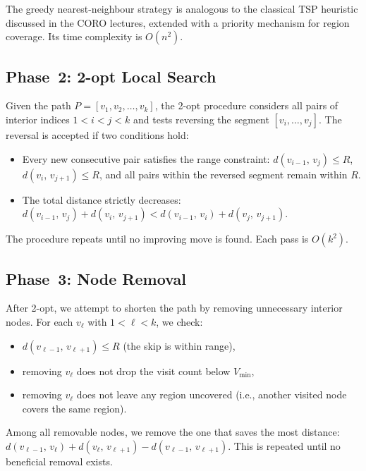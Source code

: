 \documentclass[12pt, a4paper]{article}
\newcommand{\dist}[2]{d(#1,\,#2)}
\begin{document}
The greedy nearest-neighbour strategy is analogous to the classical TSP heuristic
discussed in the CORO lectures, extended with a priority mechanism for region
coverage. Its time complexity is $O(n^2)$.

\subsection{Phase~2: 2-opt Local Search}

Given the path $P = [v_1, v_2, \ldots, v_k]$, the 2-opt procedure considers all
pairs of interior indices $1 < i < j < k$ and tests reversing the segment
$[v_i, \ldots, v_j]$. The reversal is accepted if two conditions hold:
\begin{itemize}[nosep]
  \item Every new consecutive pair satisfies the range constraint:
        $\dist{v_{i-1}}{v_j} \leq R$, $\dist{v_i}{v_{j+1}} \leq R$, and all pairs
        within the reversed segment remain within $R$.
  \item The total distance strictly decreases:
        $\dist{v_{i-1}}{v_j} + \dist{v_i}{v_{j+1}}
        < \dist{v_{i-1}}{v_i} + \dist{v_j}{v_{j+1}}$.
\end{itemize}
The procedure repeats until no improving move is found. Each pass is $O(k^2)$.

\subsection{Phase~3: Node Removal}

After 2-opt, we attempt to shorten the path by removing unnecessary interior nodes.
For each $v_\ell$ with $1 < \ell < k$, we check:
\begin{itemize}[nosep]
  \item $\dist{v_{\ell-1}}{v_{\ell+1}} \leq R$ (the skip is within range),
  \item removing $v_\ell$ does not drop the visit count below $V_{\min}$,
  \item removing $v_\ell$ does not leave any region uncovered (i.e., another visited
        node covers the same region).
\end{itemize}
Among all removable nodes, we remove the one that saves the most distance:
$\dist{v_{\ell-1}}{v_\ell} + \dist{v_\ell}{v_{\ell+1}} -
\dist{v_{\ell-1}}{v_{\ell+1}}$. This is repeated until no beneficial removal exists.


\end{document}
